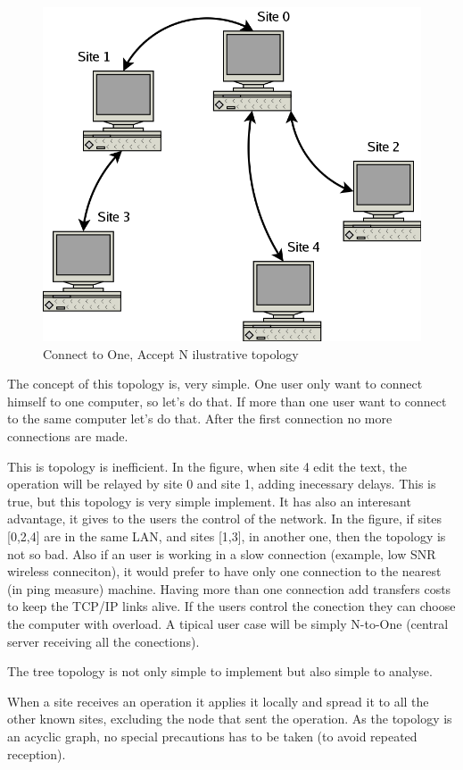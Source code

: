 \documentclass{article}
\begin{document}
\begin{figure}[htbp]
 \begin{center}
    \includegraphics[angle=0,width=0.5\linewidth]{schemas/connect_to_one_accept_N.png}
 \end{center}
 \label{fig:connectooneacceptN}
 \caption{Connect to One, Accept N ilustrative topology}
\end{figure}

The concept of this topology is, very simple. One user only want to connect himself to one computer, so let's do that. If more than one user want to connect to the same computer let's do that. After the first connection no more connections are made.

This is topology is inefficient. In the figure, when site 4 edit the text, the operation will be relayed by site 0 and site 1, adding inecessary delays. This is true, but this topology is very simple implement. It has also an interesant advantage, it gives to the users the control of the network. In the figure, if sites [0,2,4] are in the same LAN, and sites [1,3], in another one, then the topology is not so bad. Also if an user is working in a slow connection (example, low SNR wireless conneciton), it would prefer to have only one connection to the nearest (in ping measure) machine. Having more than one connection add transfers costs to keep the TCP/IP links alive. If the users control the conection they can choose the computer with overload. A tipical user case will be simply N-to-One (central server receiving all the conections).
 
The tree topology is not only simple to implement but also simple to analyse.
    
When a site receives an operation it applies it locally and spread it to all the other known sites, excluding the node that sent the operation. As the topology is an acyclic graph, no special precautions has to be taken (to avoid repeated reception).
\end{document}
